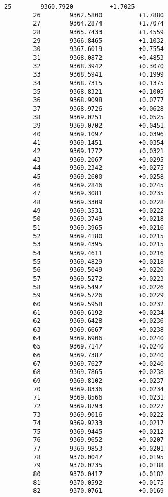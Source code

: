 \documentclass[11pt]{article}
\begin{document}
\begin{Verbatim}[commandchars=\\\{\}]
        25        9360.7920          +1.7025
        26        9362.5800          +1.7880
        27        9364.2874          +1.7074
        28        9365.7433          +1.4559
        29        9366.8465          +1.1032
        30        9367.6019          +0.7554
        31        9368.0872          +0.4853
        32        9368.3942          +0.3070
        33        9368.5941          +0.1999
        34        9368.7315          +0.1375
        35        9368.8321          +0.1005
        36        9368.9098          +0.0777
        37        9368.9726          +0.0628
        38        9369.0251          +0.0525
        39        9369.0702          +0.0451
        40        9369.1097          +0.0396
        41        9369.1451          +0.0354
        42        9369.1772          +0.0321
        43        9369.2067          +0.0295
        44        9369.2342          +0.0275
        45        9369.2600          +0.0258
        46        9369.2846          +0.0245
        47        9369.3081          +0.0235
        48        9369.3309          +0.0228
        49        9369.3531          +0.0222
        50        9369.3749          +0.0218
        51        9369.3965          +0.0216
        52        9369.4180          +0.0215
        53        9369.4395          +0.0215
        54        9369.4611          +0.0216
        55        9369.4829          +0.0218
        56        9369.5049          +0.0220
        57        9369.5272          +0.0223
        58        9369.5497          +0.0226
        59        9369.5726          +0.0229
        60        9369.5958          +0.0232
        61        9369.6192          +0.0234
        62        9369.6428          +0.0236
        63        9369.6667          +0.0238
        64        9369.6906          +0.0240
        65        9369.7147          +0.0240
        66        9369.7387          +0.0240
        67        9369.7627          +0.0240
        68        9369.7865          +0.0238
        69        9369.8102          +0.0237
        70        9369.8336          +0.0234
        71        9369.8566          +0.0231
        72        9369.8793          +0.0227
        73        9369.9016          +0.0222
        74        9369.9233          +0.0217
        75        9369.9445          +0.0212
        76        9369.9652          +0.0207
        77        9369.9853          +0.0201
        78        9370.0047          +0.0195
        79        9370.0235          +0.0188
        80        9370.0417          +0.0182
        81        9370.0592          +0.0175
        82        9370.0761          +0.0169

\end{Verbatim}
\end{document}
